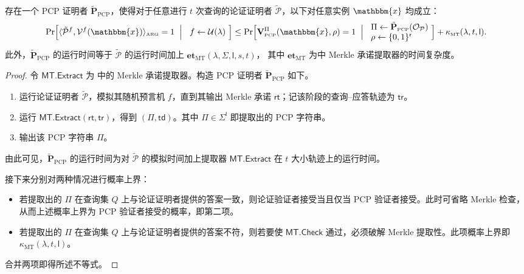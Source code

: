 \documentclass[american,singlepageview]{snargs-book-zh}
\newcommand{\Bits}{\{0,1\}}
\newcommand{\Malicious}[1]{\tilde{#1}}
\newcommand{\Interact}[2]{\langle #1, #2 \rangle}
\newcommand{\BlackBox}[1]{\mathcal{O}_{#1}}
\newcommand{\StateExperiment}[1]{
\!\begin{array}{l}
#1
\end{array}\!}
\newcommand{\Instance}{\mathbbm{x}}
\newcommand{\ProtoProver}{P}
\newcommand{\ProtoVerifier}{V}
\newcommand{\ProtoKnowledgeError}{\kappa}
\newcommand{\ProtoKnowledgeTime}{\mathbf{et}}
\newcommand{\ProtoAlphabet}{\Sigma}
\newcommand{\ProtoProofLength}{\mathsf{l}}
\newcommand{\ProtoRandomnessComplexity}{\mathsf{r}}
\newcommand{\PCPSubscript}{\scriptscriptstyle\mathrm{PCP}}
\newcommand{\PCPFormat}[1]{\mathbf{#1}}
\newcommand{\PCPVerifier}{\PCPFormat{\ProtoVerifier}_{\PCPSubscript}}
\newcommand{\PCPMaliciousProver}{\Malicious{\PCPFormat{\ProtoProver}}_{\PCPSubscript}}
\newcommand{\PCPString}{\Pi}
\newcommand{\PCPQuerySet}{Q}
\newcommand{\PCPVerifierRandomMessage}{\rho}
\newcommand{\PCPAlphabet}{\ProtoAlphabet}
\newcommand{\PCPProofLength}{\ProtoProofLength}
\newcommand{\PCPRandomnessComplexity}{\ProtoRandomnessComplexity}
\newcommand{\ARGFormat}[1]{\mathcal{#1}}
\newcommand{\ARGProver}{\ARGFormat{\ProtoProver}}
\newcommand{\ARGVerifier}{\ARGFormat{\ProtoVerifier}}
\newcommand{\ARGInteract}[2]{\Interact{#1}{#2}_{\scriptscriptstyle\mathrm{ARG}}}
\newcommand{\ROFunction}{f}
\newcommand{\ROQueryBound}{t}
\newcommand{\RODistribution}[1]{\mathcal{U}(#1)}
\newcommand{\SecurityParameter}{\lambda}
\newcommand{\PrivacyParameter}{s}
\newcommand{\ROTrace}{\mathsf{tr}}
\newcommand{\MTSymbol}{\mathsf{MT}}
\newcommand{\MTSubscript}{{\scriptscriptstyle\mathrm{MT}}}
\newcommand{\MTCheck}{\MTSymbol.\mathsf{Check}}
\newcommand{\MTExtractor}{\MTSymbol.\mathsf{Extract}}
\newcommand{\MTCommitment}{\mathsf{rt}}
\newcommand{\MTTrapdoor}{\mathsf{td}}
\newcommand{\MTExtractionError}{\ProtoKnowledgeError_{\MTSubscript}}
\newcommand{\MTExtractorTimeSymbol}{\ProtoKnowledgeTime_{\MTSubscript}}
\newcommand{\MTExtractorTimeFunction}[5]{\MTExtractorTimeSymbol(#1,#2,#3,#4,#5)}
\begin{document}
\begin{lemma}
\label{lemma:kilian-nonadaptive-reduction}
存在一个 PCP 证明者 $\PCPMaliciousProver$，使得对于任意进行 $\ROQueryBound$ 次查询的论证证明者 $\Malicious{\ARGProver}$，以下对任意实例 $\Instance$ 均成立：
\[
\Pr\Bigl[
  \ARGInteract{\Malicious{\ARGProver}^{\ROFunction}}{\ARGVerifier^{\ROFunction}(\Instance)}=1
  \;\Bigm|\;
  \StateExperiment{\ROFunction\gets\RODistribution{\SecurityParameter}}
\Bigr]
\le
\Pr\Bigl[
  \PCPVerifier^{\PCPString}(\Instance,\PCPVerifierRandomMessage)=1
  \;\Bigm|\;
  \StateExperiment{
    \PCPString\gets\PCPMaliciousProver(\BlackBox{\ARGProver})\\
    \PCPVerifierRandomMessage\gets\Bits^{\PCPRandomnessComplexity}
  }
\Bigr]
+
\MTExtractionError(\SecurityParameter,\ROQueryBound,\PCPProofLength).
\]
此外，$\PCPMaliciousProver$ 的运行时间等于 $\Malicious{\ARGProver}$ 的运行时间加上
\(\MTExtractorTimeFunction{\SecurityParameter}{\PCPAlphabet}{\PCPProofLength}{\PrivacyParameter}{\ROQueryBound}\)，
其中 $\MTExtractorTimeSymbol$ 为中 Merkle 承诺提取器的时间复杂度。
\end{lemma}

\begin{proof}
令 $\MTExtractor$ 为 中的 Merkle 承诺提取器。构造 PCP 证明者 $\PCPMaliciousProver$ 如下。
\begin{enumerate}[nolistsep]
  \item 运行论证证明者 $\Malicious{\ARGProver}$，模拟其随机预言机 $\ROFunction$，直到其输出 Merkle 承诺 $\MTCommitment$；记该阶段的查询–应答轨迹为 $\ROTrace$。
  \item 运行 $\MTExtractor(\MTCommitment,\ROTrace)$，得到
    $(\PCPString,\MTTrapdoor)$。其中 $\PCPString\in\PCPAlphabet^{\PCPProofLength}$ 即提取出的 PCP 字符串。
  \item 输出该 PCP 字符串 $\PCPString$。
\end{enumerate}
由此可见，$\PCPMaliciousProver$ 的运行时间为对 $\Malicious{\ARGProver}$ 的模拟时间加上提取器 $\MTExtractor$ 在 $\ROQueryBound$ 大小轨迹上的运行时间。

接下来分别对两种情况进行概率上界：
\begin{itemize}[nolistsep]
  \item 若提取出的 $\PCPString$ 在查询集 $\PCPQuerySet$ 上与论证证明者提供的答案一致，则论证验证者接受当且仅当 PCP 验证者接受。此时可省略 Merkle 检查，从而上述概率上界为 PCP 验证者接受的概率，即第二项。
  \item 若提取出的 $\PCPString$ 在查询集 $\PCPQuerySet$ 上与论证证明者提供的答案不符，则若要使 $\MTCheck$ 通过，必须破解 Merkle 提取性。此项概率上界即 $\MTExtractionError(\SecurityParameter,\ROQueryBound,\PCPProofLength)$。
\end{itemize}
合并两项即得所述不等式。
\end{proof}
\end{document}
